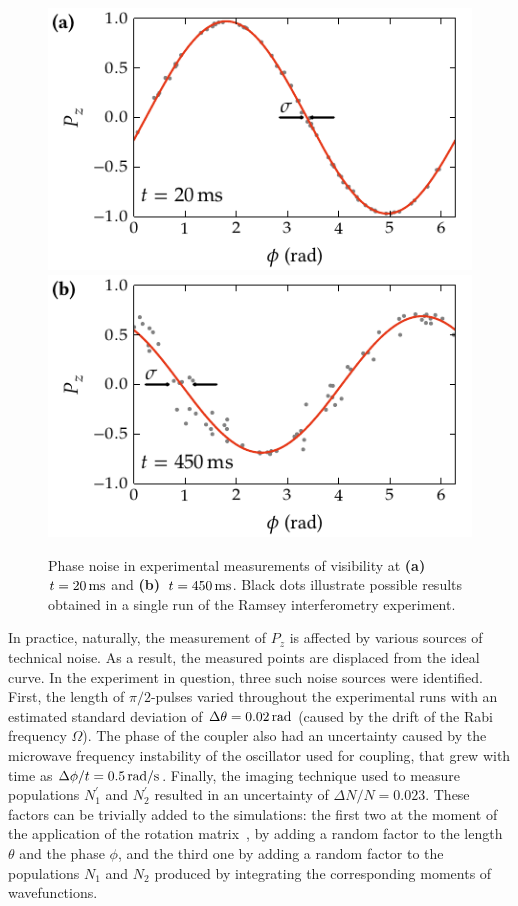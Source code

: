 \begin{figure}
    \centerline{%
    \includegraphics{figures_generated/bec_noise/illustration_noise_20ms.pdf}%
    \includegraphics{figures_generated/bec_noise/illustration_noise_450ms.pdf}}

    \caption[Phase noise in experimental measurements of visibility]{
    Phase noise in experimental measurements of visibility at \textbf{(a)}~$t = 20\mbox{\ensuremath{\,\mathrm{ms}}}$ and \textbf{(b)}~$t = 450\mbox{\ensuremath{\,\mathrm{ms}}}$.
    Black dots illustrate possible results obtained in a single run of the Ramsey interferometry experiment.}%

    \label{fig:bec-noise:phase-noise:illustration}
\end{figure}

In practice, naturally, the measurement of $P_z$ is affected by various sources of technical noise.
As a result, the measured points are displaced from the ideal curve.
In the experiment in question, three such noise sources were identified.
First, the length of $\pi/2$-pulses varied throughout the experimental runs with an estimated standard deviation of $\Delta \theta = 0.02\mbox{\ensuremath{\,\mathrm{rad}}}$ (caused by the drift of the Rabi frequency $\Omega$).
The phase of the coupler also had an uncertainty caused by the microwave frequency instability of the oscillator used for coupling, that grew with time as $\Delta \phi / t = 0.5\mbox{\ensuremath{\,\mathrm{rad/s}}}$.
Finally, the imaging technique used to measure populations $N_1^\prime$ and $N_2^\prime$ resulted in an uncertainty of $\Delta N / N = 0.023$.
These factors can be trivially added to the simulations: the first two at the moment of the application of the rotation matrix~, by adding a random factor to the length $\theta$ and the phase $\phi$, and the third one by adding a random factor to the populations $N_1$ and $N_2$ produced by integrating the corresponding moments of wavefunctions.


